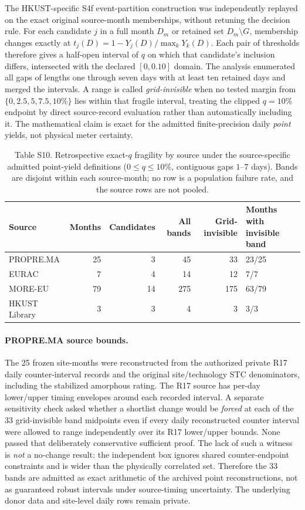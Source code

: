 \documentclass[11pt]{article}
\begin{document}
The HKUST-specific S4f event-partition construction was independently replayed on the exact original source-month memberships, without retuning the decision rule. For each candidate $j$ in a full month $D_m$ or retained set $D_m\setminus G$, membership changes exactly at $t_j(D)=1-Y_j(D)/\max_k Y_k(D)$. Each pair of thresholds therefore gives a half-open interval of $q$ on which that candidate's inclusion differs, intersected with the declared $[0,0.10]$ domain. The analysis enumerated all gaps of lengths one through seven days with at least ten retained days and merged the intervals. A range is called \emph{grid-invisible} when no tested margin from $\{0,2.5,5,7.5,10\%\}$ lies within that fragile interval, treating the clipped $q=10\%$ endpoint by direct source-record evaluation rather than automatically including it. The mathematical claim is exact for the admitted finite-precision daily \emph{point} yields, not physical meter certainty.

\begin{table}[ht]
\centering
\caption*{Table S10. Retrospective exact-$q$ fragility by source under the source-specific admitted point-yield definitions ($0\leq q\leq10\%$, contiguous gaps $1$--$7$ days). Bands are disjoint within each source-month; no row is a population failure rate, and the source rows are not pooled.}
\small
\begin{tabular}{p{2.6cm}rrrrp{3.1cm}}
\toprule
Source & Months & Candidates & All bands & Grid-invisible & Months with invisible band \\
\midrule
PROPRE.MA & 25 & 3 & 45 & 33 & 23/25 \\
EURAC & 7 & 4 & 14 & 12 & 7/7 \\
MORE-EU & 79 & 14 & 275 & 175 & 63/79 \\
HKUST Library & 3 & 3 & 4 & 3 & 3/3 \\
\bottomrule
\end{tabular}
\end{table}

\paragraph{PROPRE.MA source bounds.}
The 25 frozen site-months were reconstructed from the authorized private R17 daily counter-interval records and the original site/technology STC denominators, including the stabilized amorphous rating. The R17 source has per-day lower/upper timing envelopes around each recorded interval. A separate sensitivity check asked whether a shortlist change would be \emph{forced} at each of the 33 grid-invisible band midpoints even if every daily reconstructed counter interval were allowed to range independently over its R17 lower/upper bounds. None passed that deliberately conservative sufficient proof. The lack of such a witness is \emph{not} a no-change result: the independent box ignores shared counter-endpoint constraints and is wider than the physically correlated set. Therefore the 33 bands are admitted as exact arithmetic of the archived point reconstructions, not as guaranteed robust intervals under source-timing uncertainty. The underlying donor data and site-level daily rows remain private.
\end{document}

